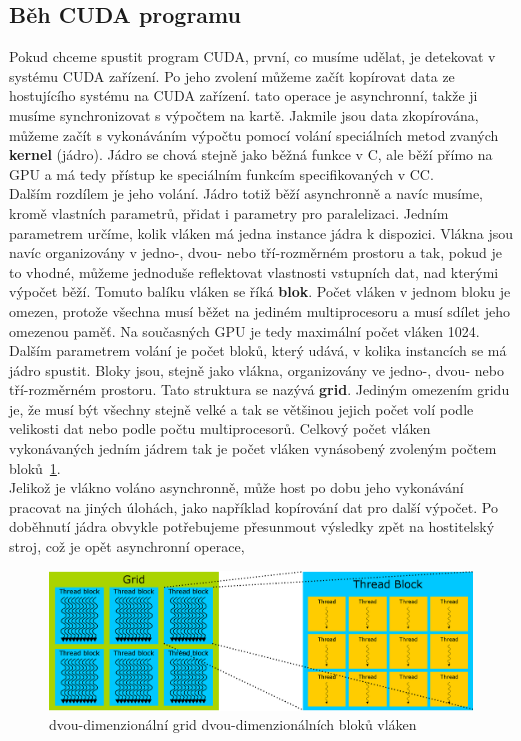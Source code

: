 \subsection{Běh CUDA programu}
Pokud chceme spustit program CUDA, první, co musíme udělat, je detekovat v systému CUDA zařízení. Po jeho zvolení můžeme začít kopírovat data ze hostujícího systému na CUDA zařízení. tato operace je asynchronní, takže ji musíme synchronizovat s výpočtem na kartě. Jakmile jsou data zkopírována, můžeme začít s vykonáváním výpočtu pomocí volání speciálních metod zvaných \textbf{kernel} (jádro). Jádro se chová stejně jako běžná funkce v C, ale běží přímo na GPU a má tedy přístup ke speciálním funkcím specifikovaných v CC.\\ 

Dalším rozdílem je jeho volání. Jádro totiž běží asynchronně a navíc musíme, kromě vlastních parametrů, přidat i parametry pro paralelizaci. Jedním parametrem určíme, kolik vláken má jedna instance jádra k dispozici. Vlákna jsou navíc organizovány v jedno-, dvou- nebo tří-rozměrném prostoru a tak, pokud je to vhodné, můžeme jednoduše reflektovat vlastnosti vstupních dat, nad kterými výpočet běží. Tomuto balíku vláken se říká \textbf{blok}. Počet vláken v jednom bloku je omezen, protože všechna musí běžet na jediném multiprocesoru a musí sdílet jeho omezenou paměť. Na současných GPU je tedy maximální počet vláken 1024.\\

Dalším parametrem volání je počet bloků, který udává, v kolika instancích se má jádro spustit. Bloky jsou, stejně jako vlákna, organizovány ve jedno-, dvou- nebo tří-rozměrném prostoru. Tato struktura se nazývá \textbf{grid}. Jediným omezením gridu je, že musí být všechny stejně velké a tak se většinou jejich počet volí podle velikosti dat nebo podle počtu multiprocesorů. Celkový počet vláken vykonávaných jedním jádrem tak je počet vláken vynásobený zvoleným počtem bloků~\ref{fig:cudagridthreadblock}.\\

Jelikož je vlákno voláno asynchronně, může host po dobu jeho vykonávání pracovat na jiných úlohách, jako například kopírování dat pro další výpočet. Po doběhnutí jádra obvykle potřebujeme přesunmout výsledky zpět na hostitelský stroj, což je opět asynchronní operace,\\

\begin{figure}[h]
  \centering
  \includegraphics[width=1\linewidth]{img/CUDAthreadGridBlock.eps}
  \caption{dvou-dimenzionální grid dvou-dimenzionálních bloků vláken}
  \label{fig:cudagridthreadblock}
\end{figure}

